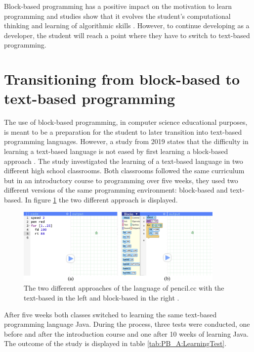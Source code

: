Block-based programming has a positive impact on the motivation to learn programming and studies show that it evolves the student's computational thinking and learning of algorithmic skills \cite{FromBlockToText}. However, to continue developing as a developer, the student will reach a point where they have to switch to text-based programming.

\section{Transitioning from block-based to text-based programming} 
The use of block-based programming, in computer science educational purposes, is meant to be a preparation for the student to later transition into text-based programming languages. However, a study from 2019 states that the difficulty in learning a text-based language is not eased by first learning a block-based approach \cite{FromBlockToText}. The study investigated the learning of a text-based language in two different high school classrooms. Both classrooms followed the same curriculum but in an introductory course to programming over five weeks, they used two different versions of the same programming environment: block-based and text-based. In figure \ref{PA:pencilccFig} the two different approach is displayed. 

\begin{figure}[H] 
    \begin{center}
        \includegraphics[width=0.9\textwidth]{Files/Billeder: Analyse/Pencilcc.jpg}
    \end{center}
    \caption{The two different approaches of the language of pencil.cc with the text-based in the left and block-based in the right \cite{FromBlockToText}.}
    \label{PA:pencilccFig}
\end{figure}

After five weeks both classes switched to learning the same text-based programming language Java. During the process, three tests were conducted, one before and after the introduction course and one after 10 weeks of learning Java. The outcome of the study is displayed in table \ref{tab:PB_A:LearningTest}. 


